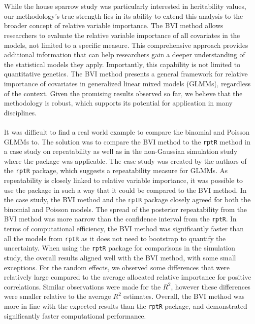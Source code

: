 \\
\\
While the house sparrow study was particularly interested in heritability values, our methodology's true strength lies in its ability to extend this analysis to the broader concept of relative variable importance. The BVI method allows researchers to evaluate the relative variable importance of all covariates in the models, not limited to a specific measure. This comprehensive approach provides additional information that can help researchers gain a deeper understanding of the statistical models they apply. Importantly, this capability is not limited to quantitative genetics. The BVI method presents a general framework for relative importance of covariates in generalized linear mixed models (GLMMs), regardless of the context. Given the promising results observed so far, we believe that the methodology is robust, which supports its potential for application in many disciplines.
\\
\\
It was difficult to find a real world example to compare the binomial and Poisson GLMMs to. The solution was to compare the BVI method to the \texttt{rptR} method in a case study on repeatability as well as in the non-Gaussian simulation study where the package was applicable. The case study was created by the authors of the \texttt{rptR} package, which suggests a repeatability measure for GLMMs. As repeatability is closely linked to relative variable importance, it was possible to use the package in such a way that it could be compared to the BVI method. In the case study, the BVI method and the \texttt{rptR} package closely agreed for both the binomial and Poisson models. The spread of the posterior repeatability from the BVI method was more narrow than the confidence interval from the \texttt{rptR}. In terms of computational efficiency, the BVI method was significantly faster than all the models from \texttt{rptR} as it does not need to bootstrap to quantify the uncertainty. When using the \texttt{rptR} package for comparisons in the simulation study, the overall results aligned well with the BVI method, with some small exceptions. For the random effects, we observed some differences that were relatively large compared to the average allocated relative importance for positive correlations. Similar observations were made for the $R^2$, however these differences were smaller relative to the average $R^2$ estimates. Overall, the BVI method was more in line with the expected results than the \texttt{rptR} package, and demonstrated significantly faster computational performance.  
